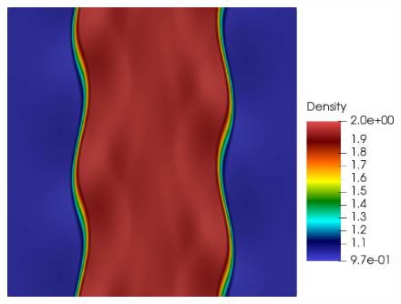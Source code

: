 \begin{figure}[h!]
\includegraphics[scale=0.115]{data/Compressible_Euler/KH/Snapshots/density_exact_307.png}\\


\end{figure}

